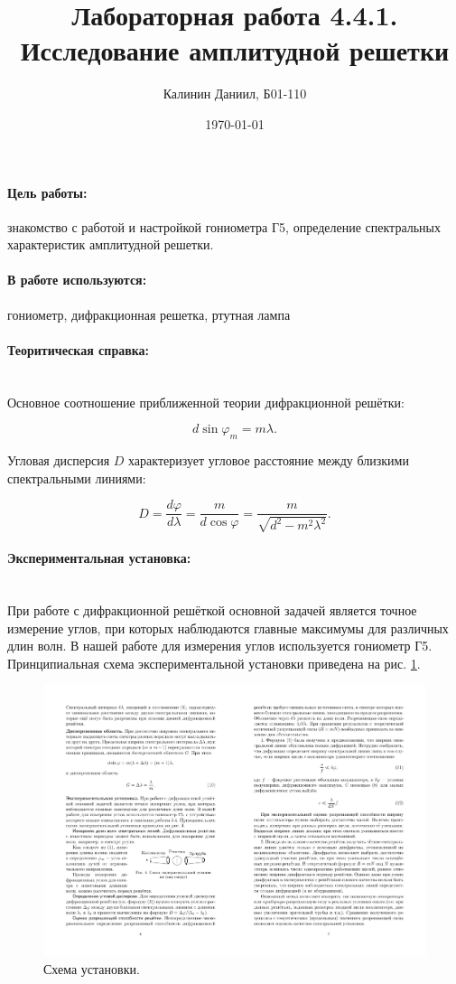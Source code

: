 \documentclass[a4paper, 12pt]{article}
\author{Калинин Даниил, Б01-110}
\date{\today}
\title{Лабораторная работа 4.4.1. Исследование амплитудной решетки}
\newcommand{\parag}[1]{\paragraph*{#1:}}
\begin{document}
\maketitle
\parindent=0cm

\parag {Цель работы}
знакомство с работой и настройкой гониометра Г5, определение спектральных характеристик амплитудной решетки.

\parag {В работе используются}
гониометр, дифракционная решетка, ртутная лампа

\parag {Теоритическая справка} ~\\
Основное соотношение приближенной теории дифракционной решётки:

\begin{equation}
    d\sin \varphi_m = m\lambda.
\end{equation}

Угловая дисперсия $D$ характеризует угловое расстояние между близкими спектральными линиями:

\begin{equation}
    D = \frac{d\varphi}{d\lambda} = \frac{m}{d \cos \varphi}=\frac{m}{\sqrt{d^{2}-m^{2} \lambda^{2}}}.
\end{equation}

\parag {Экспериментальная установка}~\\
При работе с дифракционной решёткой основной задачей является точное измерение углов, при которых наблюдаются главные максимумы для различных длин волн. В нашей работе для измерения углов используется гониометр Г5. Принципиальная схема экспериментальной установки приведена на рис. \ref{img:setup}.

\begin{figure}[h]
    \centering
    \includegraphics[scale=1.5]{setup.pdf}
    \caption{Схема установки.}
    \label{img:setup}
\end{figure}
\end{document}
